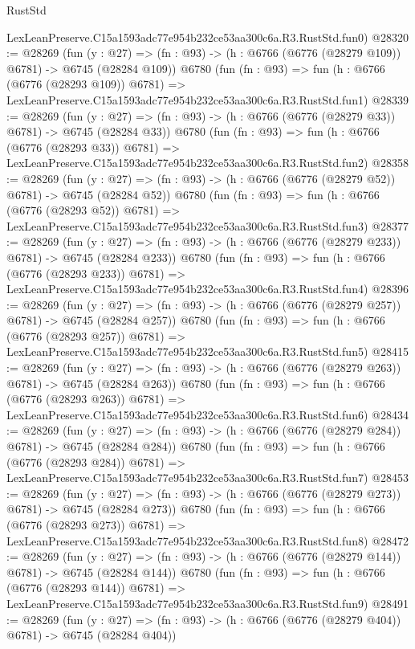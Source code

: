 \begin{lexlean}{RustStd}
\begin{coremodule}
    LexLeanPreserve.C15a1593adc77e954b232ce53aa300c6a.R3.RustStd.fun0)
@28320 := @28269
    (fun (y : @27) => (fn : @93) -> (h : @6766 (@6776 (@28279 @109)) @6781) -> @6745 (@28284 @109))
    @6780
    (fun (fn : @93) =>
    fun (h : @6766 (@6776 (@28293 @109)) @6781) =>
    LexLeanPreserve.C15a1593adc77e954b232ce53aa300c6a.R3.RustStd.fun1)
@28339 := @28269
    (fun (y : @27) => (fn : @93) -> (h : @6766 (@6776 (@28279 @33)) @6781) -> @6745 (@28284 @33))
    @6780
    (fun (fn : @93) =>
    fun (h : @6766 (@6776 (@28293 @33)) @6781) =>
    LexLeanPreserve.C15a1593adc77e954b232ce53aa300c6a.R3.RustStd.fun2)
@28358 := @28269
    (fun (y : @27) => (fn : @93) -> (h : @6766 (@6776 (@28279 @52)) @6781) -> @6745 (@28284 @52))
    @6780
    (fun (fn : @93) =>
    fun (h : @6766 (@6776 (@28293 @52)) @6781) =>
    LexLeanPreserve.C15a1593adc77e954b232ce53aa300c6a.R3.RustStd.fun3)
@28377 := @28269
    (fun (y : @27) => (fn : @93) -> (h : @6766 (@6776 (@28279 @233)) @6781) -> @6745 (@28284 @233))
    @6780
    (fun (fn : @93) =>
    fun (h : @6766 (@6776 (@28293 @233)) @6781) =>
    LexLeanPreserve.C15a1593adc77e954b232ce53aa300c6a.R3.RustStd.fun4)
@28396 := @28269
    (fun (y : @27) => (fn : @93) -> (h : @6766 (@6776 (@28279 @257)) @6781) -> @6745 (@28284 @257))
    @6780
    (fun (fn : @93) =>
    fun (h : @6766 (@6776 (@28293 @257)) @6781) =>
    LexLeanPreserve.C15a1593adc77e954b232ce53aa300c6a.R3.RustStd.fun5)
@28415 := @28269
    (fun (y : @27) => (fn : @93) -> (h : @6766 (@6776 (@28279 @263)) @6781) -> @6745 (@28284 @263))
    @6780
    (fun (fn : @93) =>
    fun (h : @6766 (@6776 (@28293 @263)) @6781) =>
    LexLeanPreserve.C15a1593adc77e954b232ce53aa300c6a.R3.RustStd.fun6)
@28434 := @28269
    (fun (y : @27) => (fn : @93) -> (h : @6766 (@6776 (@28279 @284)) @6781) -> @6745 (@28284 @284))
    @6780
    (fun (fn : @93) =>
    fun (h : @6766 (@6776 (@28293 @284)) @6781) =>
    LexLeanPreserve.C15a1593adc77e954b232ce53aa300c6a.R3.RustStd.fun7)
@28453 := @28269
    (fun (y : @27) => (fn : @93) -> (h : @6766 (@6776 (@28279 @273)) @6781) -> @6745 (@28284 @273))
    @6780
    (fun (fn : @93) =>
    fun (h : @6766 (@6776 (@28293 @273)) @6781) =>
    LexLeanPreserve.C15a1593adc77e954b232ce53aa300c6a.R3.RustStd.fun8)
@28472 := @28269
    (fun (y : @27) => (fn : @93) -> (h : @6766 (@6776 (@28279 @144)) @6781) -> @6745 (@28284 @144))
    @6780
    (fun (fn : @93) =>
    fun (h : @6766 (@6776 (@28293 @144)) @6781) =>
    LexLeanPreserve.C15a1593adc77e954b232ce53aa300c6a.R3.RustStd.fun9)
@28491 := @28269
    (fun (y : @27) => (fn : @93) -> (h : @6766 (@6776 (@28279 @404)) @6781) -> @6745 (@28284 @404))

\end{coremodule}
\end{lexlean}
